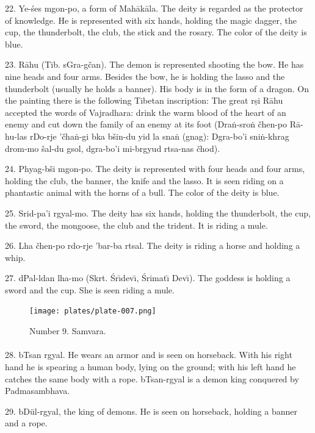 \documentclass[a4paper, 12pt, oneside]{article}
\begin{document}
22. Ye-\'{s}es mgon-po, a form of Mah\={a}k\={a}la. The deity is regarded as the protector of knowledge. He is represented with six hands, holding the magic dagger, the cup, the thunderbolt, the club, the stick and the rosary. The color of the deity is blue.

23. R\={a}hu (Tib. sGra-gčan). The demon is represented shooting the bow. He has nine heads and four arms. Besides the bow, he is holding the lasso and the thunderbolt (usually he holds a banner). His body is in the form of a dragon. On the painting there is the following Tibetan inscription: The great r\d{s}i R\={a}hu accepted the words of Vajradhara: drink the warm blood of the heart of an enemy and cut down the family of an enemy at its foot (Dra\.{n}-sro\.{n} čhen-po R\={a}-hu-las rDo-rje 'čha\.{n}-gi bka bšin-du yid la sna\.{n} (gnag): Dgra-bo'i sni\.{n}-khrag drom-mo šal-du gsol, dgra-bo'i mi-brgyud rtsa-nas čhod).

24. Phyag-bši mgon-po. The deity is represented with four heads and four arms, holding the club, the banner, the knife and the lasso. It is seen riding on a phantastic animal with the horns of a bull. The color of the deity is blue.

25. Srid-pa'i rgyal-mo. The deity has six hands, holding the thunderbolt, the cup, the sword, the mongoose, the club and the trident. It is riding a mule.

26. Lha čhen-po rdo-rje 'bar-ba rtsal. The deity is riding a horse and holding a whip.

27. dPal-ldan lha-mo (Skrt. \'{S}r\={\i}dev\={\i}, \'{S}rimat\={\i} Dev\={\i}). The goddess is holding a sword and the cup. She is seen riding a mule.

\clearpage
\vspace*{\fill}
\begin{figure}[H]
\centering
\texttt{[image: plates/plate-007.png]}
\caption*{Number 9. Samvara.}
\end{figure}
\vspace*{\fill}
\clearpage
\paragraph{}
28. bTsan rgyal. He wears an armor and is seen on horseback. With his right hand he is spearing a human body, lying on the ground; with his left hand he catches the same body with a rope. bTsan-rgyal is a demon king conquered by Padmasambhava.

29. bDül-rgyal, the king of demons. He is seen on horseback, holding a banner and a rope.
\end{document}
